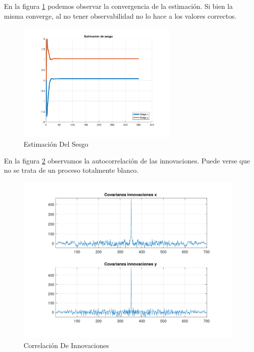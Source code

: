 	En la figura \ref{fig:ej4e_bias} podemos observar la convergencia de la estimación. Si bien la misma converge, al no tener observabilidad no lo hace a los valores correctos.
	
	\begin{figure}[H]
		\centering
		\includegraphics[width=0.7\textwidth,keepaspectratio]{Figuras/bias_ej4e.pdf}
		\caption{Estimación Del Sesgo}
		\label{fig:ej4e_bias}
	\end{figure}
	
	En la figura \ref{fig:ej4e_cov} observamos la autocorrelación de las innovaciones. Puede verse que no se trata de un proceso totalmente blanco.
	
	\begin{figure}[H]
		\centering
		\includegraphics[width=1.0\textwidth,keepaspectratio]{Figuras/covinn_ej4e.pdf}
		\caption{Correlación De Innovaciones}
		\label{fig:ej4e_cov}
	\end{figure}

